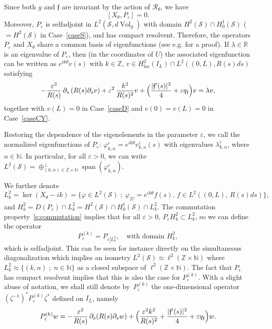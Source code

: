 \documentclass[10pt]{amsart}
\newcommand{\sep}{\;;\;}
\theoremstyle{definition}
\newcommand{\calR}{\ensuremath{\mathcal R}}
\newcommand{\calS}{\ensuremath{\mathcal S}}
\newcommand{\mb}[1]{\ensuremath{\mathbb{#1}}}
\newcommand{\N}{{\mb{N}}}
\newcommand{\R}{{\mb{R}}}
\newcommand{\Z}{\mathbb Z}
\newcommand{\f}{\ensuremath{\mathfrak{f}}}
\DeclareMathOperator{\Vol}{Vol}
\DeclareMathOperator{\vect}{span}
\newcommand{\loc}{\mathrm{loc}}
\let\d\partial
\let\eps\varepsilon
\newcommand{\qf}{q_{\f}}
\providecommand{\eg}{e.g.}\providecommand{\ie}{i.e.}\providecommand{\etc}{etc.}
\begin{document}
Since both $g$ and $\f$ are invariant by the action of $\calR_\theta$, we have
\begin{equation}
\label{e:commutation}
[X_{\theta}, P_\eps ] =0.
\end{equation}
Moreover, $P_\eps$ is selfadjoint in $L^2(\calS, d\Vol_g)$ with domain $H^2(\calS) \cap H^1_0(\calS)$ ($=H^2(\calS)$ in Case~\ref{caseS}), and has compact resolvent. Therefore, the operators $P_\eps$ and $X_\theta$ share a common basis of eigenfunctions (see \eg \cite[\S 3.2]{LL:18} for a proof).
If $\lambda \in\R$ is an eigenvalue of $P_\eps$, then (in the coordinates of $U$) the associated eigenfunction can be written as $e^{ik \theta}v(s)$ with $k\in \Z$, $v \in H^2_{\loc}(I_L)\cap L^2\left((0,L), R(s)ds\right)$ satisfying
\begin{equation}
\label{equationk1D}
- \frac{\eps^2 }{R(s)}\, \d_s\left( R(s) \d_s v \right) + \eps^2\,\frac{k^2}{R(s)^2} v+ \Bigl( \frac{|\f'(s)|^2}{4} + \eps \qf\Bigr) v =\lambda v,
\end{equation}
together with $v(L)=0$ in Case~\ref{caseD} and $v(0)=v(L)=0$ in Case~\ref{caseCY}.

Restoring the dependence of the eigenelements in the parameter $\eps$, we call the normalized eigenfunctions of $P_\eps$: $\varphi_{k,n}^\eps=e^{ik \theta} v_{k,n}^\eps(s)$ with eigenvalues $\lambda_{k,n}^\eps$, where \hbox{$n\in \N$}. In particular, for all $\eps>0$, we can write $L^2(\calS)= \oplus^{\perp }_{(k,n)\in \Z\times \N}\vect (\varphi_{k,n}^\eps) $.

We further denote
\[
L^2_k=\ker (X_{\theta}-ik)=\bigl\{\varphi\in L^2(\calS)\sep\varphi_{|U} =e^{ik \theta}f(s),\,f \in L^2\left((0,L),\,R(s)ds\right)\bigr\},
\]
and $H^2_k=D(P_\eps) \cap L^2_k = H^2(\calS)\cap H^1_0(\calS)\cap L^2_k$. The commutation property~\eqref{e:commutation} implies that for all $\eps>0$, $P_\eps H^2_k\subset L^2_k$, so we can define the operator
\begin{equation}
\label{defPk}P_{\eps}^{(k)} =P_{\eps\left|L^2_k\right.}, \quad \text{with domain } H^2_k,
\end{equation}
which is selfadjoint. This can be seen for instance directly on the simultaneous diagonalization which implies an isometry $L^2(\calS) \approx \ell^2(\Z\times \N)$ where $L^2_k\approx\{(k,n)\sep n\in \N\}$ as a closed subspace of $\ell^2(\Z\times \N)$. The fact that $P_{\eps}$ has compact resolvent implies that this is also the case for $P_{\eps}^{(k)}$.
With a slight abuse of notation, we shall still denote by~$P_{\eps}^{(k)}$ the one-dimensional operator $(\zeta^{-1})^*P_{\eps}^{(k)} \zeta^*$ defined on $I_L$, namely
\begin{equation}
\label{equationk1D-bis}
P_{\eps}^{(k)} w = - \frac{\eps^2 }{R(s)}\, \d_s( R(s) \d_s w) + \Bigl(\frac{ \eps^2 k^2}{R(s)^2} + \frac{|\f'(s)|^2}{4} + \eps \qf\Bigr) w.
\end{equation}
\end{document}
